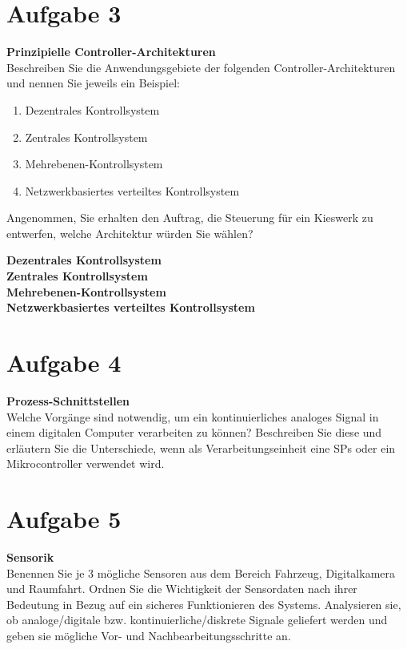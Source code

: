 \documentclass[12pt,a4paper,ngerman]{article}
\begin{document}
\pagebreak


\section{Aufgabe 3}
\begin{framed}
\textbf{Prinzipielle Controller-Architekturen} \\
Beschreiben Sie die Anwendungsgebiete der folgenden Controller-Architekturen und nennen Sie jeweils ein Beispiel:
\begin{enumerate}
\item Dezentrales Kontrollsystem
\item Zentrales Kontrollsystem
\item Mehrebenen-Kontrollsystem
\item Netzwerkbasiertes verteiltes Kontrollsystem
\end{enumerate}
Angenommen, Sie erhalten den Auftrag, die Steuerung für ein Kieswerk zu entwerfen, welche Architektur würden Sie wählen?
\end{framed}

\textbf{Dezentrales Kontrollsystem}
\\
\textbf{Zentrales Kontrollsystem}
\\
\textbf{Mehrebenen-Kontrollsystem}
\\
\textbf{Netzwerkbasiertes verteiltes Kontrollsystem}
\\



\pagebreak


\section{Aufgabe 4}
\begin{framed}
\textbf{Prozess-Schnittstellen} \\
Welche Vorgänge sind notwendig, um ein kontinuierliches analoges Signal in einem digitalen Computer verarbeiten zu können?
Beschreiben Sie diese und erläutern Sie die Unterschiede, wenn als Verarbeitungseinheit eine SPs oder ein Mikrocontroller verwendet wird. 
\end{framed}
\pagebreak




\section{Aufgabe 5}
\begin{framed}
\textbf{Sensorik} \\
Benennen Sie je 3 mögliche Sensoren aus dem Bereich Fahrzeug, Digitalkamera und Raumfahrt. Ordnen Sie die Wichtigkeit der Sensordaten nach ihrer Bedeutung in Bezug auf ein sicheres Funktionieren des Systems. Analysieren sie, ob analoge/digitale bzw. kontinuierliche/diskrete Signale geliefert werden und geben sie mögliche Vor- und Nachbearbeitungsschritte an. 
\end{framed}
\end{document}

